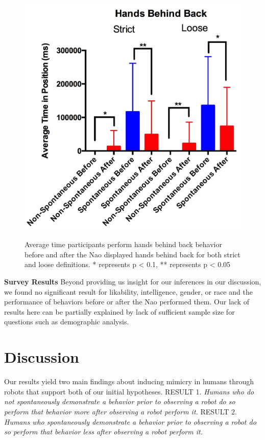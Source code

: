 \documentclass{acm_proc_article-sp}
\begin{document}
\begin{figure}[t!]
\centering
 \includegraphics[width=1.00\linewidth]{images/back.jpg}\\
 \caption{Average time participants perform hands behind back behavior before and after the Nao displayed hands behind back for both strict and loose definitions. * represents p < 0.1, ** represents p < 0.05} 
 \label{back} %
\end{figure}

\textbf{Survey Results} Beyond providing us insight for our inferences in our discussion, we found no significant result for likability, intelligence, gender, or race and the performance of behaviors before or after the Nao performed them. Our lack of results here can be partially explained by lack of sufficient sample size for questions such as demographic analysis.

\section{Discussion}
Our results yield two main findings about inducing mimicry in humans through robots that support both of our initial hypotheses.
RESULT 1. \textit{Humans who do not spontaneously demonstrate a behavior prior to observing a robot do so perform that behavior more after observing a robot perform it.}
RESULT 2. \textit{Humans who spontaneously demonstrate a behavior prior to observing a robot do so perform that behavior less after observing a robot perform it.}
\end{document}
